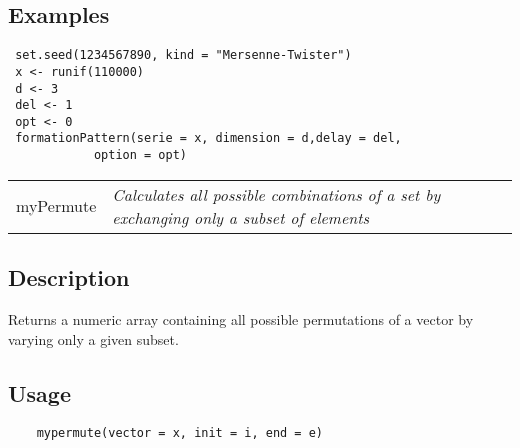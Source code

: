 \documentclass[12pt,letterpaper]{article}
\begin{document}
\subsection*{Examples}

\begin{lstlisting}
 set.seed(1234567890, kind = "Mersenne-Twister")
 x <- runif(110000)
 d <- 3
 del <- 1
 opt <- 0
 formationPattern(serie = x, dimension = d,delay = del,
 			option = opt)
\end{lstlisting}

\vspace{0.5cm}


\hrulefill   

\begin{table}[!ht]
\begin{center}
\begin{tabularx}{\textwidth}{ X X}
\hspace{0.5cm} myPermute & \textit{Calculates all possible combinations of a set by exchanging only a subset of elements}\\
\end{tabularx}
\end{center}
\end{table} 

\vspace{-0.5cm}

\hrulefill  

\vspace{0.5cm}

\subsection*{Description}

Returns a numeric array containing all possible permutations of a vector by varying only a given subset.

\vspace{0.5cm}

\subsection*{Usage}

\begin{lstlisting}
    mypermute(vector = x, init = i, end = e)
\end{lstlisting}

\vspace{0.5cm}
\end{document}
